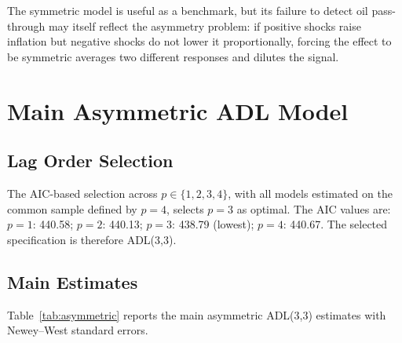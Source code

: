 The symmetric model is useful as a benchmark, but its failure to detect oil pass-through may itself reflect the asymmetry problem: if positive shocks raise inflation but negative shocks do not lower it proportionally, forcing the effect to be symmetric averages two different responses and dilutes the signal.

\section{Main Asymmetric ADL Model}

\subsection{Lag Order Selection}

The AIC-based selection across $p \in \{1, 2, 3, 4\}$, with all models estimated on the common sample defined by $p = 4$, selects $p = 3$ as optimal. The AIC values are: $p = 1$: 440.58; $p = 2$: 440.13; $p = 3$: 438.79 (lowest); $p = 4$: 440.67. The selected specification is therefore ADL(3,3).

\subsection{Main Estimates}

Table~\ref{tab:asymmetric} reports the main asymmetric ADL(3,3) estimates with Newey--West standard errors.

